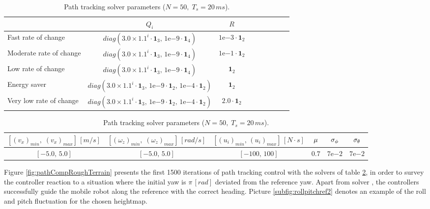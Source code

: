 \begin{table}[!htb]
  \caption[Solver parameters for simulation over irregular terrain.]{Path tracking solver parameters ($N = 50,\; T_s = 20\,ms$).}
  \label{tab:RoughPathTrackingSpecs}
  \renewcommand{\arraystretch}{1.2}
  \centering
  \begin{tabular}[]{lcccccccc}
	\toprule
	& $Q_i$ & $R$\\
	\midrule
	Fast rate of change & $diag\left(3.0\times 1.1^i \cdot \mathbf{1}_3,\,1\mathrm{e}{-9} \cdot \mathbf{1}_4\right)$ & $1\mathrm{e}{-3} \cdot \mathbf{1}_2$\\
	Moderate rate of change & $diag\left(3.0\times 1.1^i \cdot \mathbf{1}_3,\,1\mathrm{e}{-9} \cdot \mathbf{1}_4\right)$ & $1\mathrm{e}{-1} \cdot \mathbf{1}_2$\\
	Low rate of change & $diag\left(3.0\times 1.1^i \cdot \mathbf{1}_3,\,1\mathrm{e}{-9} \cdot \mathbf{1}_4\right)$ & $\mathbf{1}_2$\\
	Energy saver & $diag\left(3.0\times 1.1^i \cdot \mathbf{1}_3,\,1\mathrm{e}{-9} \cdot \mathbf{1}_2,\,1\mathrm{e}{-4} \cdot \mathbf{1}_2\right)$ & $\mathbf{1}_2$\\
	Very low rate of change & $diag\left(3.0\times 1.1^i \cdot \mathbf{1}_3,\,1\mathrm{e}{-9} \cdot \mathbf{1}_2,\,1\mathrm{e}{-4} \cdot \mathbf{1}_2\right)$ & $2.0 \cdot \mathbf{1}_2$\\
	\end{tabular}
	\begin{tabular}[]{cccccc}
  	\toprule
  		$\left[(v_x)_{min},\; (v_x)_{max}\right]\,[m/s]$ & $\left[(\omega_z)_{min},\; (\omega_z)_{max}\right]\,[rad/s]$ & $\left[(u_i)_{min},\,(u_i)_{max}\right]\,[N \cdot s]$ & $\mu$ & $\sigma_{\phi}$ & $\sigma_{\theta}$\\
  	\midrule
  		$\left[-5.0,\,5.0\right]$ & $\left[-5.0,\,5.0\right]$ & $\left[-100,\,100\right]$ & $0.7$ & $7\mathrm{e}{-2}$ & $7\mathrm{e}{-2}$\\
  	\bottomrule
  \end{tabular}
\end{table}

Figure \ref{fig:pathCompRoughTerrain} presents the first 1500 iterations of path tracking control with the solvers of table \ref{tab:RoughPathTrackingSpecs}, in order to survey the controller reaction to a situation where the initial yaw is $\pi\,[rad]$ deviated from the reference yaw. Apart from solver , the controllers successfully guide the mobile robot along the reference with the correct heading. Picture \ref{subfig:rollpitchref2} denotes an example of the roll and pitch fluctuation for the chosen heightmap.


